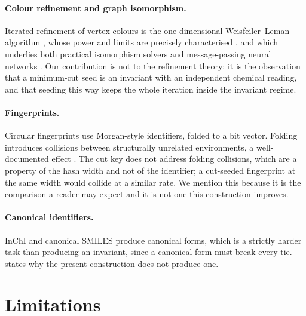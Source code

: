 \documentclass[11pt,twocolumn,a4paper]{article}
\theoremstyle{crthm}
\theoremstyle{definition}
\theoremstyle{remark}
\begin{document}
\paragraph{Colour refinement and graph isomorphism.} Iterated refinement
of vertex colours is the one-dimensional Weisfeiler--Leman algorithm
\citep{weisfeiler1968}, whose power and limits are precisely characterised
\citep{cai1992,arvind2015}, and which underlies both practical isomorphism
solvers \citep{mckay1981,mckay2014} and message-passing neural networks
\citep{xu2019}. Our contribution is not to the refinement theory: it is
the observation that a minimum-cut seed is an invariant with an
independent chemical reading, and that seeding this way keeps the whole
iteration inside the invariant regime.

\paragraph{Fingerprints.} Circular fingerprints
\citep{rogers2010,glen2006} use Morgan-style identifiers, folded to a bit
vector. Folding introduces collisions between structurally unrelated
environments, a well-documented effect
\citep{riniker2013,oboyle2016}. The cut key does not address folding
collisions, which are a property of the hash width and not of the
identifier; a cut-seeded fingerprint at the same width would collide at a
similar rate. We mention this because it is the comparison a reader may
expect and it is not one this construction improves.

\paragraph{Canonical identifiers.} InChI \citep{heller2015} and canonical
SMILES \citep{weininger1989,schneider2015} produce canonical forms, which
is a strictly harder task than producing an invariant, since a canonical
form must break every tie.  states why the present
construction does not produce one.

\section{Limitations}
\label{sec:limits}
\end{document}
